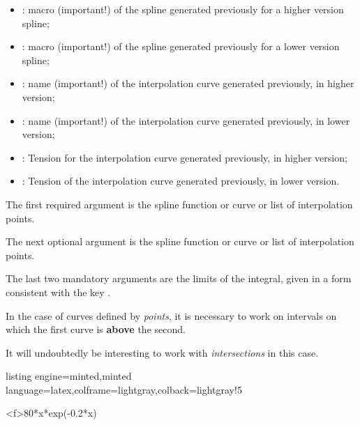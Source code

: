 \documentclass[11pt,a4paper]{ltxdoc}
\begin{document}
\begin{itemize}
	\item {}: macro (important!) of the spline generated previously for a higher version spline;
	\item {}: macro (important!) of the spline generated previously for a lower version spline;
	\item {}: name (important!) of the interpolation curve generated previously, in higher version;
	\item {}: name (important!) of the interpolation curve generated previously, in lower version;
	\item {}: Tension for the interpolation curve generated previously, in higher version;
	\item {}: Tension of the interpolation curve generated previously, in lower version.
\end{itemize}

\smallskip

The first required argument is the spline function or curve or list of interpolation points.

\smallskip

The next optional argument is the spline function or curve or list of interpolation points.

\smallskip

The last two mandatory arguments are the limits of the integral, given in a form consistent with the key .

\pagebreak

In the case of curves defined by \textit{points}, it is necessary to work on intervals on which the first curve is \textbf{above} the second.

It will undoubtedly be interesting to work with \textit{intersections} in this case.

\begin{tcblisting}{listing engine=minted,minted language=latex,colframe=lightgray,colback=lightgray!5}
\begin{GraphTikz}%
	[x=0.6cm,y=0.06cm,
	Xmin=0,Xmax=21,Xgrid=1,Xgrids=0.5,
	Ymin=0,Ymax=155,Ygrid=10,Ygrids=5]
	\DrawAxisGrids[Grads=false,Enlarge=2.5mm]{}{}
	{80*x*exp(-0.2*x)}
\end{GraphTikz}
\end{tcblisting}
\end{document}
